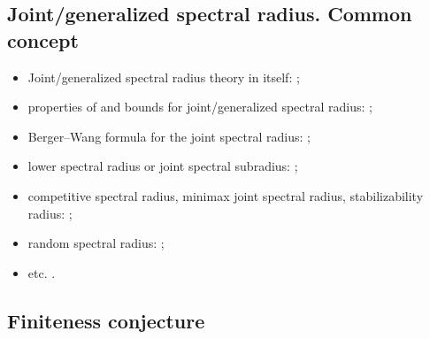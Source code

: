 \documentclass[a4paper,fleqn]{article}
\let\cite=\citep
\begin{document}
\subsection*{Joint/generalized spectral radius. Common concept}
\begin{itemize}
  \item Joint/generalized spectral radius theory in itself: \cite{AhmPar:CDC12,
      BKPW:LAA08, Blondel:LAA08, Bochi15, Breuillard2022, Cicone:ArXiv15,
      CMS:LAA21, CMMS:EJP23, Els:LAA95, Gao:ArXiv25, Gao:BLMS26, Jungers:09,
      Jungers:LNCS13, Moeller15, MolReif:LAA14, MorSid:JEMS13,
      OgurMart:LAA14, Prot:FPM96:e, Prot:IZV97:e, Prot:FU98, RotaStr:IM60,
      ShulTur:JFA00, KisShulTur:20, KisShulTur:JMS22, ShulTur:ArXiv08,
      Strang03, Theys:PhD05, XuXiao:AJIFAC11};
  \item properties of and bounds for joint/generalized spectral radius:
    \cite{Alpin:MZ10, Breuillard2022, CJ:IJAMCS06, CJN:AISC15, Gil:UJMA19,
      GugProt:MC23, GS:MCRF20, HStr:LASP92, Koz:DEDS10, Koz:LAA10,
      Maesumi:TIC95, Maesumi:LAA96, MorSid:JEMS13, Morris:ADVM10,
      Peperko:LAA12, Wirth:MTNS04, Wirth:LAA05, XuAci:IEEETAC20, Zhou:AMC06};
  \item Berger--Wang formula for the joint spectral radius: \cite{BF:AIF21,
      Breuillard2022, CDHMS:ArXiv25, Koz:LAA14, Morris:JFA12,
      Oregon-Reyes:JEPM20};
  \item lower spectral radius or joint spectral subradius:
    \cite{BochiMor:PLMS15, CJ:IJAMCS06, CJ:IJAMCS07, Czornik:LAA05,
      DekKui:JEMS11, GugMai:SIMAX26, Jungers:LAA12, Morris:LAA17,
      MP:DCDCA18};
  \item competitive spectral radius, minimax joint spectral radius,
    stabilizability radius: \cite{AGMM:CDC25, Dettmann:ArXiv25, DJM:SCL20,
      DZ:ArXiv25, AGM:ArXiv24, JunMas:SIAMJCO17, Koz:DCDSB19};
  \item random spectral radius: \cite{MTG:ArXiv25};
  \item etc. \cite{GugZen:LAA12, Koz:LAA09, Oreg-Reyes:MastThes18,
      Pascoe:IJM21}.
\end{itemize}

\subsection*{Finiteness conjecture}
\end{document}
